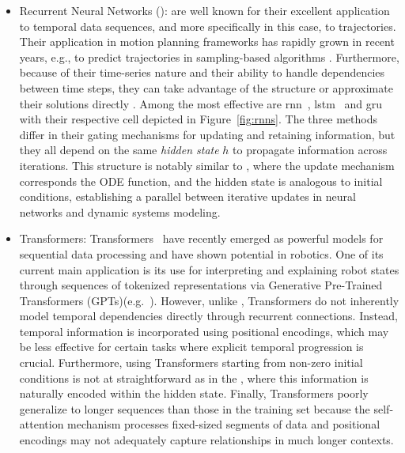\begin{itemize}
    \item Recurrent Neural Networks ():  are well known for their excellent application to temporal data sequences, and more specifically in this case, to trajectories.
    Their application in motion planning frameworks has rapidly grown in recent years, e.g., to predict trajectories in sampling-based algorithms \cite{cRNNTraj1,cRNNTraj2}.
    Furthermore, because of their time-series nature and their ability to handle dependencies between time steps, they can take advantage of the  structure \cite{cNODE} or approximate their solutions directly \cite{crnnodes}.
    Among the most effective are \gls{rnn}~\cite{cRNN}, \gls{lstm}~\cite{cLSTM} and \gls{gru}~\cite{cGRU} with their respective cell depicted in Figure~\ref{fig:rnns}.
    The three methods differ in their gating mechanisms for updating and retaining information, but they all depend on the same \emph{hidden state} $h$ to propagate information across iterations.
    This structure is notably similar to , where the update mechanism corresponds the ODE function, and the hidden state is analogous to initial conditions, establishing a parallel between iterative updates in neural networks and dynamic systems modeling.
    \item Transformers: Transformers~\cite{cTrans} have recently emerged as powerful models for sequential data processing and have shown potential in robotics.
    One of its current main application is its use for interpreting and explaining robot states through sequences of tokenized representations via Generative Pre-Trained Transformers (GPTs)(e.g.~\cite{cGPTRobotics}).
    However, unlike , Transformers do not inherently model temporal dependencies directly through recurrent connections. 
    Instead, temporal information is incorporated using positional encodings, which may be less effective for certain tasks where explicit temporal progression is crucial.
    Furthermore, using Transformers starting from non-zero initial conditions is not at straightforward as in the , where this information is naturally encoded within the hidden state.
    Finally, Transformers poorly generalize to longer sequences than those in the training set because the self-attention mechanism processes fixed-sized segments of data and positional encodings may not adequately capture relationships in much longer contexts.
\end{itemize}

